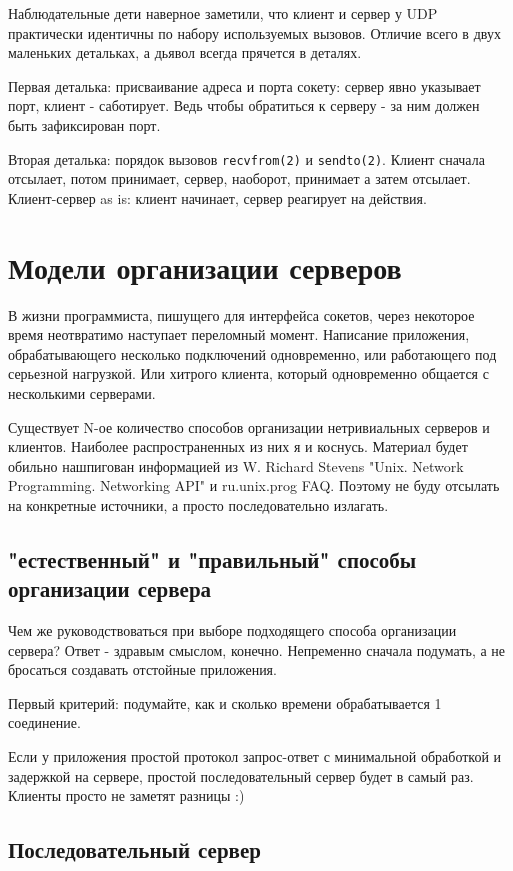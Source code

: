 Наблюдательные дети наверное заметили, что клиент и сервер у UDP практически идентичны по набору используемых вызовов. Отличие всего в двух маленьких детальках, а дьявол всегда прячется в деталях.

Первая деталька: присваивание адреса и порта сокету: сервер явно указывает порт, клиент - саботирует. Ведь чтобы обратиться к серверу - за ним должен быть зафиксирован порт.

Вторая деталька: порядок вызовов \verb+recvfrom(2)+ и \verb+sendto(2)+. Клиент сначала отсылает, потом принимает, сервер, наоборот, принимает а затем отсылает. Клиент-сервер as is: клиент начинает, сервер реагирует на действия.

\section{Модели организации серверов}

В жизни программиста, пишущего для интерфейса сокетов, через некоторое время неотвратимо наступает переломный момент. Написание приложения, обрабатывающего несколько подключений одновременно, или работающего под серьезной нагрузкой. Или хитрого клиента, который одновременно общается с несколькими серверами.

Существует N-ое количество способов организации нетривиальных серверов и клиентов. Наиболее распространенных из них я и коснусь. Материал будет обильно нашпигован информацией из W. Richard Stevens "Unix. Network Programming. Networking API" и ru.unix.prog FAQ. Поэтому не буду отсылать на конкретные источники, а просто последовательно излагать.

\subsection{"естественный" и "правильный" способы организации сервера}

Чем же руководствоваться при выборе подходящего способа организации сервера? Ответ - здравым смыслом, конечно. Непременно сначала подумать, а не бросаться создавать отстойные приложения.

Первый критерий: подумайте, как и сколько времени обрабатывается 1 соединение.

Если у приложения простой протокол запрос-ответ с минимальной обработкой и задержкой на сервере, простой последовательный сервер будет в самый раз. Клиенты просто не заметят разницы :)

\subsection{Последовательный сервер}

